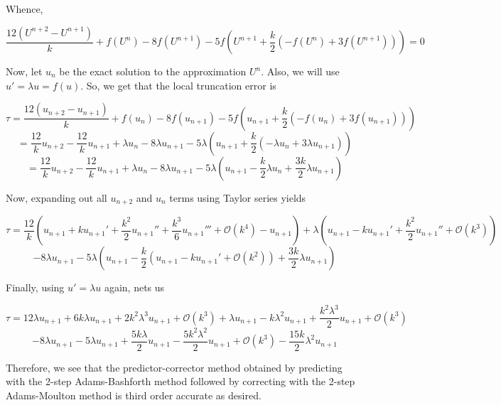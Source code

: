 \begin{solution}
    Whence,

    $$\frac{12(U^{n+2}-U^{n+1})}{k}+f(U^n)-8f(U^{n+1})-5f(U^{n+1}+\frac{k}{2}(-f(U^n)+3f(U^{n+1})))=0$$

    Now, let $u_n$ be the exact solution to the approximation $U^n$. Also, we will use 
    $u'=\lambda u=f(u)$. So, we get that the local truncation error is

    $$\tau=\frac{12(u_{n+2}-u_{n+1})}{k}+f(u_n)-8f(u_{n+1})-5f(u_{n+1}+
    \frac{k}{2}(-f(u_n)+3f(u_{n+1})))$$
    $$=\frac{12}{k}u_{n+2}-\frac{12}{k}u_{n+1}+\lambda u_n-8\lambda u_{n+1}-5\lambda(u_{n+1}+
    \frac{k}{2}(-\lambda u_n+3\lambda u_{n+1}))$$
    $$=\frac{12}{k}u_{n+2}-\frac{12}{k}u_{n+1}+\lambda u_n-8\lambda u_{n+1}-5\lambda(u_{n+1}-
    \frac{k}{2}\lambda u_n+\frac{3k}{2}\lambda u_{n+1})$$

    Now, expanding out all $u_{n+2}$ and $u_n$ terms using Taylor series yields

    $$\tau=\frac{12}{k}(u_{n+1}+ku_{n+1}'+\frac{k^2}{2}u_{n+1}''+\frac{k^3}{6}u_{n+1}'''+
    \mathcal{O}(k^4)-u_{n+1})+\lambda(u_{n+1}-ku_{n+1}'+\frac{k^2}{2}u_{n+1}''+\mathcal{O}(k^3))$$
    $$-8\lambda u_{n+1}-5\lambda(u_{n+1}-\frac{k}{2}(u_{n+1}-ku_{n+1}'+\mathcal{O}(k^2))+
    \frac{3k}{2}\lambda u_{n+1})$$

    Finally, using $u'=\lambda u$ again, nets us

    $$\tau=12\lambda u_{n+1}+6k\lambda u_{n+1}+2k^2\lambda^3u_{n+1}+\mathcal{O}(k^3)+\lambda 
    u_{n+1}-k\lambda^2 u_{n+1}+\frac{k^2\lambda^3}{2}u_{n+1}+\mathcal{O}(k^3)$$
    $$-8\lambda u_{n+1}-5\lambda u_{n+1}+\frac{5k\lambda}{2}u_{n+1}-\frac{5k^2\lambda^2}{2}u_{n+1}
    +\mathcal{O}(k^3)-\frac{15k}{2}\lambda^2 u_{n+1}$$

    Therefore, we see that the predictor-corrector method obtained by predicting with the 2-step
    Adams-Bashforth method followed by correcting with the 2-step Adams-Moulton method is third order
    accurate as desired.

\end{solution}